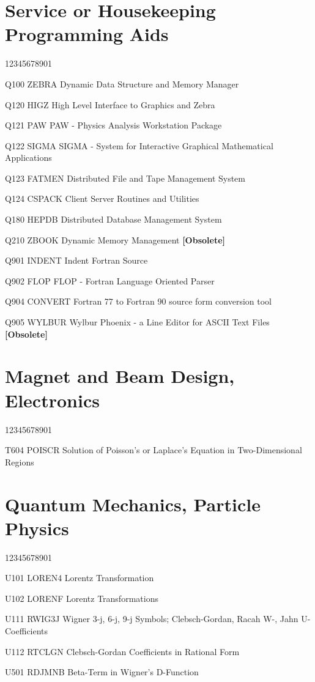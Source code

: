 \section*{Service or Housekeeping Programming Aids}
\begin{DLtt}{12345678901}
\item[Q100 ZEBRA] Dynamic Data Structure and Memory Manager
\item[Q120 HIGZ] High Level Interface to Graphics and Zebra
\item[Q121 PAW] PAW - Physics Analysis Workstation Package
\item[Q122 SIGMA] SIGMA - System for Interactive Graphical
Mathematical Applications
\item[Q123 FATMEN] Distributed File and Tape Management System
\item[Q124 CSPACK] Client Server Routines and Utilities
\item[Q180 HEPDB] Distributed Database Management System
\item[Q210 ZBOOK] Dynamic Memory Management {\bf [Obsolete]}
\item[Q901 INDENT] Indent Fortran Source
\item[Q902 FLOP] FLOP - Fortran Language Oriented Parser
\item[Q904 CONVERT] Fortran 77 to Fortran 90 source form conversion tool
\item[Q905 WYLBUR] Wylbur Phoenix - a Line Editor for ASCII Text Files
                   \textbf{[Obsolete]}
\end{DLtt}
\section*{Magnet and Beam Design, Electronics}
\begin{DLtt}{12345678901}
\item[T604 POISCR] Solution of Poisson's or Laplace's Equation in
Two-Dimensional Regions
\end{DLtt}
\section*{Quantum Mechanics, Particle Physics}
\begin{DLtt}{12345678901}
\item[U101 LOREN4] Lorentz Transformation
\item[U102 LORENF] Lorentz Transformations
\item[U111 RWIG3J] Wigner 3-j, 6-j, 9-j Symbols; Clebsch-Gordan,
Racah W-, Jahn U-Coefficients
\item[U112 RTCLGN] Clebsch-Gordan Coefficients in Rational Form
\item[U501 RDJMNB] Beta-Term in Wigner's D-Function
\end{DLtt}
